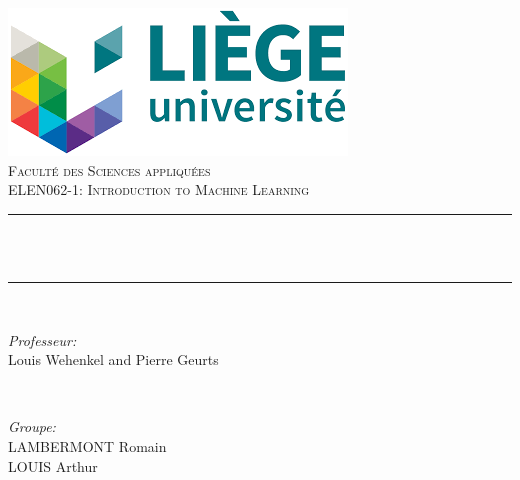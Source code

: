 \documentclass[12pt]{article}
\title{}							%
\date{\today}											%
\makeatletter
\let\thetitle\@title
\let\thedate\@date
\makeatother
\begin{document}

\begin{titlepage}
	\centering
    \includegraphics[scale = 0.7]{img/University.png}\\[1.0 cm]	%
    \textsc{\LARGE \newline\newline Faculté des Sciences appliquées}\\	%
	\textsc{\Large  ELEN062-1: Introduction to Machine Learning}\\[0.5 cm]	%
	\rule{\linewidth}{0.2 mm} \\[0.4 cm]
	{\huge \bfseries \thetitle}\\
	\rule{\linewidth}{0.2 mm} \\[2 cm]
	
	\begin{minipage}{0.5\textwidth}
		\begin{flushleft} \large
			\emph{Professeur:}\\
			Louis Wehenkel and Pierre Geurts\\
			\end{flushleft}
			\end{minipage}~
			\begin{minipage}{0.4\textwidth}
            
			\begin{flushright} \large
			\emph{Groupe:} \\
			LAMBERMONT Romain\\
            LOUIS Arthur\\
		\end{flushright}
        
	\end{minipage}\\[5 cm]
	
	
    \thedate
	
\end{titlepage}

\thispagestyle{empty}
\pagebreak
\setcounter{page}{1}
\end{document}
